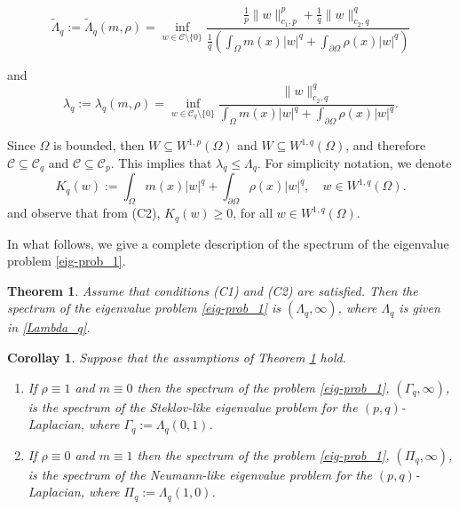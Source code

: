 \documentclass[pdflatex,sn-mathphys-num]{sn-jnl}
\theoremstyle{thmstyleone}%
\newtheorem{theorem}{Theorem}
\theoremstyle{thmstyletwo}%
\theoremstyle{thmstylethree}%
\theoremstyle{thmstylethree}%
\newtheorem{corollary}{Corollay}%
\begin{document}
\begin{equation}\label{Lambda_q2}
    \tilde{\Lambda}_q:=  \tilde{\Lambda}_q(m,\rho)= \inf_{w\in \mathcal{C} \setminus  \{0\}} \frac{\frac{1}{p}\|w\|_{c_1,p}^p+\frac{1}{q}\|w\|_{c_2,q}^q}{\frac{1}{q} \left(\int_\Omega m(x)|w|^{q}+ \int_{\partial\Omega} \rho(x)|w|^{q} \right)}
\end{equation}

and
\begin{equation}\label{eigen_q}
    \lambda_q:= \lambda_q(m,\rho)= \inf_{w\in \mathcal{C}_q \setminus  \{0\}}  \frac{\|w\|_{c_2,q}^q}{ \int_\Omega m(x)|w|^{q}+ \int_{\partial\Omega} \rho(x)|w|^{q} }.
\end{equation}

Since $\Omega$ is bounded, then $W\subseteq W^{1,p}(\Omega)$ and $W\subseteq W^{1,q}(\Omega)$, and therefore $\mathcal{C} \subseteq \mathcal{C}_q$ and $\mathcal{C} \subseteq \mathcal{C}_p$. This implies that $\lambda_q\le \Lambda_q$.
    For simplicity  notation, we denote
\begin{equation}\label{def-K_q}
K _q(w):=\int_\Omega m(x)|w|^{q}+ \int_{\partial\Omega} \rho(x)|w|^{q}, \quad w\in W^{1,q}(\Omega).
\end{equation}
 and observe that from (C2),  $K_q(w)\geqslant 0$, for all $w\in W^{1,q}(\Omega)$.


 In what follows, we give a complete description of the spectrum of the eigenvalue problem \ref{eig-prob_1}.
 
 \begin{theorem}\label{Neumman_theo}
    Assume that conditions (C1) and (C2) are satisfied. Then the spectrum of the eigenvalue problem \eqref{eig-prob_1} is $(\Lambda_q, \infty)$, where $\Lambda_q$ is given in \eqref{Lambda_q}. 
     \end{theorem}  

\begin{corollary}\label{coro-neu-stek}
Suppose that the assumptions of Theorem  \ref{Neumman_theo} hold. 
\begin{enumerate}
    \item[(i)] If $\rho\equiv 1$ and $m \equiv 0$ then the spectrum of the problem \eqref{eig-prob_1}, $(\Gamma_q, \infty)$, is the spectrum of the Steklov-like eigenvalue problem for the $(p,q)$-Laplacian,  where $\Gamma_q:= \Lambda_q(0,1)$.
    \item[(ii)] If $\rho \equiv 0$ and $m \equiv 1$ then the spectrum of the problem \eqref{eig-prob_1}, $(\Pi_q, \infty)$, is the spectrum of the Neumann-like eigenvalue problem for the $(p,q)$-Laplacian, where $\Pi_q:= \Lambda_q(1,0)$.
\end{enumerate}
\end{corollary}
\end{document}
